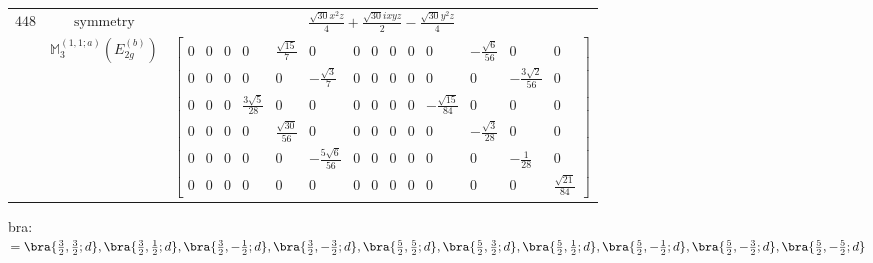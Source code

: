 \documentclass[fleqn,8pt,landscape]{jsarticle}
\begin{document}
\begin{longtable}{ccc}
$ 448 $ & $ \text{symmetry} $ & $ \frac{\sqrt{30} x^{2} z}{4} + \frac{\sqrt{30} i x y z}{2} - \frac{\sqrt{30} y^{2} z}{4} $ \\
$  $ & $ \mathbb{M}_{3}^{(1,1;a)}(E_{2g}^{(b)}) $ & $ \begin{bmatrix} 0 & 0 & 0 & 0 & \frac{\sqrt{15}}{7} & 0 & 0 & 0 & 0 & 0 & 0 & - \frac{\sqrt{6}}{56} & 0 & 0 \\ 0 & 0 & 0 & 0 & 0 & - \frac{\sqrt{3}}{7} & 0 & 0 & 0 & 0 & 0 & 0 & - \frac{3 \sqrt{2}}{56} & 0 \\ 0 & 0 & 0 & \frac{3 \sqrt{5}}{28} & 0 & 0 & 0 & 0 & 0 & 0 & - \frac{\sqrt{15}}{84} & 0 & 0 & 0 \\ 0 & 0 & 0 & 0 & \frac{\sqrt{30}}{56} & 0 & 0 & 0 & 0 & 0 & 0 & - \frac{\sqrt{3}}{28} & 0 & 0 \\ 0 & 0 & 0 & 0 & 0 & - \frac{5 \sqrt{6}}{56} & 0 & 0 & 0 & 0 & 0 & 0 & - \frac{1}{28} & 0 \\ 0 & 0 & 0 & 0 & 0 & 0 & 0 & 0 & 0 & 0 & 0 & 0 & 0 & \frac{\sqrt{21}}{84} \end{bmatrix} $ \\ \hline
\end{longtable}
bra: $=\bra{\frac{3}{2},\frac{3}{2};d}, \bra{\frac{3}{2},\frac{1}{2};d}, \bra{\frac{3}{2},- \frac{1}{2};d}, \bra{\frac{3}{2},- \frac{3}{2};d}, \bra{\frac{5}{2},\frac{5}{2};d}, \bra{\frac{5}{2},\frac{3}{2};d}, \bra{\frac{5}{2},\frac{1}{2};d}, \bra{\frac{5}{2},- \frac{1}{2};d}, \bra{\frac{5}{2},- \frac{3}{2};d}, \bra{\frac{5}{2},- \frac{5}{2};d}$
\end{document}

